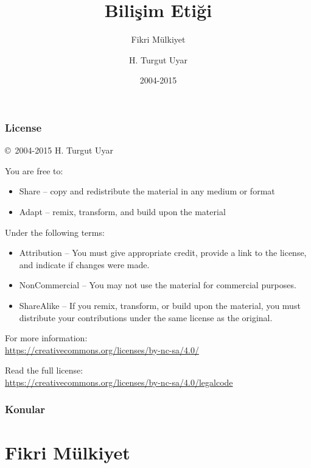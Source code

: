 \documentclass[dvipsnames]{beamer}
\title{Bilişim Etiği}
\subtitle{Fikri Mülkiyet}
\author{H. Turgut Uyar}
\date{2004-2015}
\theoremstyle{plain}
\begin{document}
\begin{frame}
  \titlepage
\end{frame}

\begin{frame}
  \frametitle{License}

  \hfill
  \copyright~2004-2015 H. Turgut Uyar

  \vfill
  \begin{footnotesize}
    You are free to:
    \begin{itemize}
      \itemsep0em
      \item Share -- copy and redistribute the material in any medium or format
      \item Adapt -- remix, transform, and build upon the material
    \end{itemize}

    Under the following terms:
    \begin{itemize}
      \itemsep0em
      \item Attribution -- You must give appropriate credit, provide a link to
        the license, and indicate if changes were made.

      \item NonCommercial -- You may not use the material for commercial
        purposes.

      \item ShareAlike -- If you remix, transform, or build upon the material,
        you must distribute your contributions under the same license as the
        original.
    \end{itemize}
  \end{footnotesize}

  \begin{small}
    For more information:\\
    \url{https://creativecommons.org/licenses/by-nc-sa/4.0/}

    \smallskip
    Read the full license:\\
    \url{https://creativecommons.org/licenses/by-nc-sa/4.0/legalcode}
  \end{small}
\end{frame}

\begin{frame}
  \frametitle{Konular}
  \tableofcontents
\end{frame}

\section{Fikri Mülkiyet}
\end{document}
